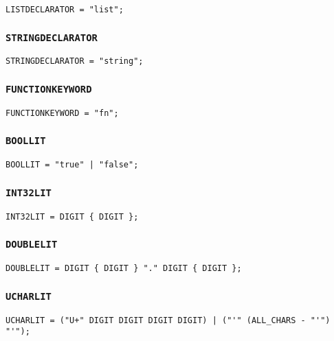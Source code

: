 \documentclass[12pt, a4paper]{article}
\begin{document}
\begin{verbatim}
LISTDECLARATOR = "list";
\end{verbatim}

\subsubsection{\texttt{STRINGDECLARATOR}}

\begin{verbatim}
STRINGDECLARATOR = "string";
\end{verbatim}

\subsubsection{\texttt{FUNCTIONKEYWORD}}

\begin{verbatim}
FUNCTIONKEYWORD = "fn";
\end{verbatim}

\subsubsection{\texttt{BOOLLIT}}

\begin{verbatim}
BOOLLIT = "true" | "false";
\end{verbatim}

\subsubsection{\texttt{INT32LIT}}

\begin{verbatim}
INT32LIT = DIGIT { DIGIT };
\end{verbatim}

\subsubsection{\texttt{DOUBLELIT}}

\begin{verbatim}
DOUBLELIT = DIGIT { DIGIT } "." DIGIT { DIGIT };
\end{verbatim}

\subsubsection{\texttt{UCHARLIT}}

\begin{verbatim}
UCHARLIT = ("U+" DIGIT DIGIT DIGIT DIGIT) | ("'" (ALL_CHARS - "'") "'");
\end{verbatim}
\end{document}
